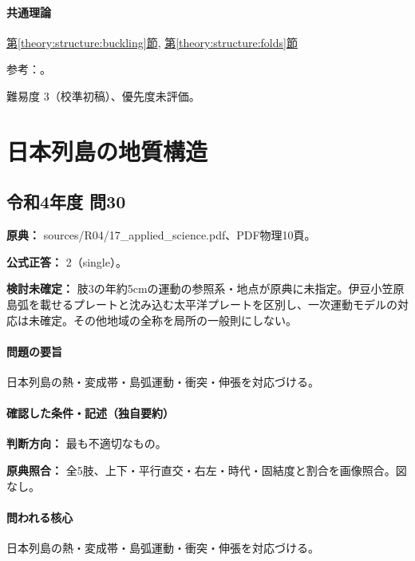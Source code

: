 \paragraph{共通理論} \hyperref[theory:structure:buckling]{第\ref*{theory:structure:buckling}節}, \hyperref[theory:structure:folds]{第\ref*{theory:structure:folds}節}

\par 参考：\cite{str_fold}。

\par 難易度 3（校準初稿）、優先度未評価。

\section{日本列島の地質構造}

\subsection{令和4年度 問30}
\label{q:r04-reg-applied-30}

\noindent\textbf{原典：} sources/R04/17\_applied\_science.pdf、PDF物理10頁。

\textbf{公式正答：} 2（single）。

\par\textbf{検討未確定：} 肢3の年約5cmの運動の参照系・地点が原典に未指定。伊豆小笠原島弧を載せるプレートと沈み込む太平洋プレートを区別し、一次運動モデルの対応は未確定。その他地域の全称を局所の一般則にしない。

\paragraph{問題の要旨} 日本列島の熱・変成帯・島弧運動・衝突・伸張を対応づける。

\paragraph{確認した条件・記述（独自要約）}\mbox{}\par

\noindent\textbf{判断方向：} 最も不適切なもの。\par

\noindent\textbf{原典照合：} 全5肢、上下・平行直交・右左・時代・固結度と割合を画像照合。図なし。\par

\paragraph{問われる核心} 日本列島の熱・変成帯・島弧運動・衝突・伸張を対応づける。

